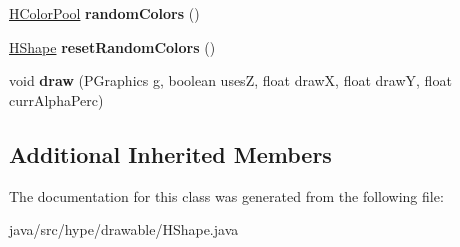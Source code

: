 \begin{DoxyCompactItemize}
\item 
\hypertarget{classhype_1_1drawable_1_1_h_shape_aa4a0712785805aa2775257996a70eac6}{\hyperlink{classhype_1_1colorist_1_1_h_color_pool}{H\-Color\-Pool} {\bfseries random\-Colors} ()}\label{classhype_1_1drawable_1_1_h_shape_aa4a0712785805aa2775257996a70eac6}

\item 
\hypertarget{classhype_1_1drawable_1_1_h_shape_aae1e34b239b134035a1f0ec05e35a7b7}{\hyperlink{classhype_1_1drawable_1_1_h_shape}{H\-Shape} {\bfseries reset\-Random\-Colors} ()}\label{classhype_1_1drawable_1_1_h_shape_aae1e34b239b134035a1f0ec05e35a7b7}

\item 
\hypertarget{classhype_1_1drawable_1_1_h_shape_a2e207a27d2bc0d50dff148baba559ee7}{void {\bfseries draw} (P\-Graphics g, boolean uses\-Z, float draw\-X, float draw\-Y, float curr\-Alpha\-Perc)}\label{classhype_1_1drawable_1_1_h_shape_a2e207a27d2bc0d50dff148baba559ee7}

\end{DoxyCompactItemize}
\subsection*{Additional Inherited Members}


The documentation for this class was generated from the following file\-:\begin{DoxyCompactItemize}
\item 
java/src/hype/drawable/H\-Shape.\-java\end{DoxyCompactItemize}
